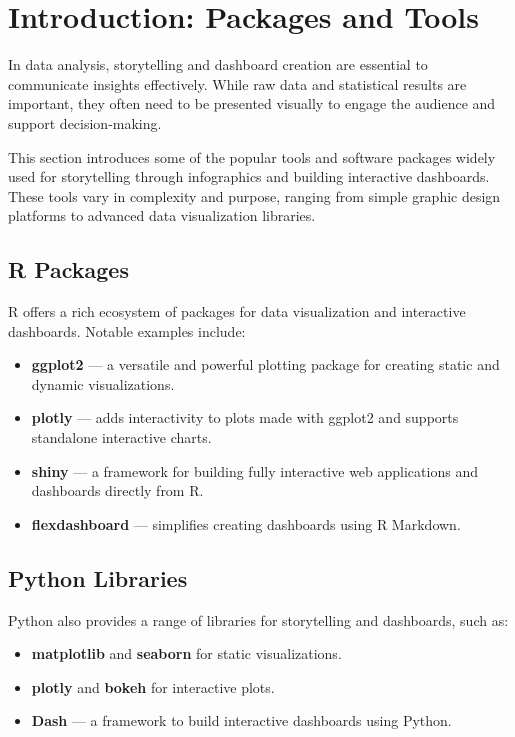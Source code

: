 \section{Introduction: Packages and Tools}

In data analysis, storytelling and dashboard creation are essential to communicate insights effectively. While raw data and statistical results are important, they often need to be presented visually to engage the audience and support decision-making.

This section introduces some of the popular tools and software packages widely used for storytelling through infographics and building interactive dashboards. These tools vary in complexity and purpose, ranging from simple graphic design platforms to advanced data visualization libraries.

\subsection*{R Packages}

R offers a rich ecosystem of packages for data visualization and interactive dashboards. Notable examples include:

\begin{itemize}
    \item \textbf{ggplot2} — a versatile and powerful plotting package for creating static and dynamic visualizations.
    \item \textbf{plotly} — adds interactivity to plots made with ggplot2 and supports standalone interactive charts.
    \item \textbf{shiny} — a framework for building fully interactive web applications and dashboards directly from R.
    \item \textbf{flexdashboard} — simplifies creating dashboards using R Markdown.
\end{itemize}

\subsection*{Python Libraries}

Python also provides a range of libraries for storytelling and dashboards, such as:

\begin{itemize}
    \item \textbf{matplotlib} and \textbf{seaborn} for static visualizations.
    \item \textbf{plotly} and \textbf{bokeh} for interactive plots.
    \item \textbf{Dash} — a framework to build interactive dashboards using Python.
\end{itemize}

